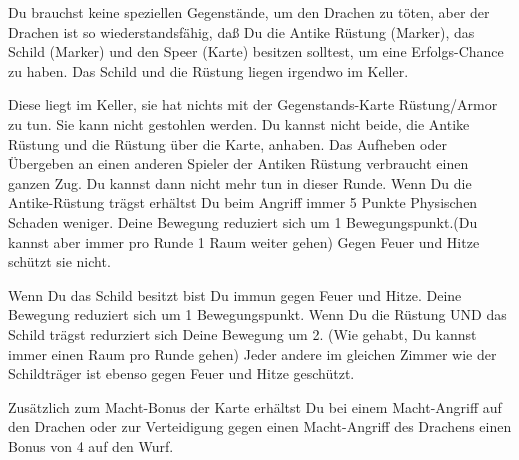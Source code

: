 





Du brauchst keine speziellen Gegenstände, um den Drachen zu töten, aber der Drachen ist so wiederstandsfähig, daß Du die Antike Rüstung (Marker), das Schild (Marker) und den Speer (Karte) besitzen solltest, um eine Erfolgs-Chance zu haben. Das Schild und die Rüstung liegen irgendwo im Keller.

Diese liegt im Keller, sie hat nichts mit der Gegenstands-Karte Rüstung/Armor zu tun. Sie kann nicht gestohlen werden. Du kannst nicht beide, die Antike Rüstung und die Rüstung über die Karte, anhaben.
Das Aufheben oder Übergeben an einen anderen Spieler der Antiken Rüstung verbraucht einen ganzen Zug. Du kannst dann nicht mehr tun in dieser Runde.
Wenn Du die Antike-Rüstung trägst erhältst Du beim Angriff immer 5 Punkte Physischen Schaden weniger.
Deine Bewegung reduziert sich um 1 Bewegungspunkt.(Du kannst aber immer pro Runde 1 Raum weiter gehen)
Gegen Feuer und Hitze schützt sie nicht.

\newpage

Wenn Du das Schild besitzt bist Du immun gegen Feuer und Hitze. Deine Bewegung reduziert sich um 1 Bewegungspunkt. Wenn Du die Rüstung UND das Schild trägst redurziert sich Deine Bewegung um 2.
(Wie gehabt, Du kannst immer einen Raum pro Runde gehen)
Jeder andere im gleichen Zimmer wie der Schildträger ist ebenso gegen Feuer und Hitze geschützt.


Zusätzlich zum Macht-Bonus der Karte erhältst Du bei einem Macht-Angriff auf den Drachen oder zur Verteidigung gegen einen Macht-Angriff des Drachens einen Bonus von 4 auf den Wurf.




